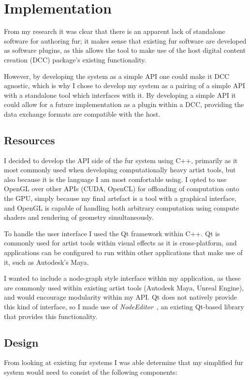 \documentclass[]{acmsiggraph}
\begin{document}
\section{Implementation} \label{sec:implementation}
From my research it was clear that there is an apparent lack of standalone software for authoring fur; it makes sense that existing fur software are developed as software plugins, as this allows the tool to make use of the host digital content creation (DCC) package's existing functionality.

However, by developing the system as a simple API one could make it DCC agnostic, which is why I chose to develop my system as a pairing of a simple API with a standalone tool which interfaces with it. By developing a simple API it could allow for a future implementation as a plugin within a DCC, providing the data exchange formats are compatible with the host.

\subsection{Resources} \label{sec:resources}
I decided to develop the API side of the fur system using C++, primarily as it most commonly used when developing computationally heavy artist tools, but also because it is the language I am most comfortable using. I opted to use OpenGL over other APIs (CUDA, OpenCL) for offloading of computation onto the GPU, simply because my final artefact is a tool with a graphical interface, and OpenGL is capable of handling both arbitrary computation using compute shaders and rendering of geometry simultaneously.

To handle the user interface I used the Qt framework within C++. Qt is commonly used for artist tools within visual effects as it is cross-platform, and applications can be configured to run within other applications that make use of it, such as Autodesk's Maya.

I wanted to include a node-graph style interface within my application, as these are commonly used within existing artist tools (Autodesk Maya, Unreal Engine), and would encourage modularity within my API. Qt does not natively provide this kind of interface, so I made use of \textit{NodeEditor}~\cite{Pinaev2017}, an existing Qt-based library that provides this functionality.

\subsection{Design} \label{sec:design}
From looking at existing fur systems I was able determine that my simplified fur system would need to consist of the following components:
\end{document}
